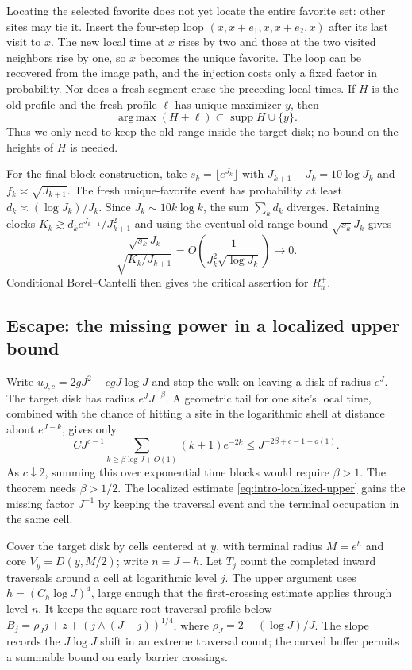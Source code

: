 Locating the selected favorite does not yet locate the entire favorite set:
other sites may tie it. Insert the four-step loop
$(x,x+e_1,x,x+e_2,x)$ after its last visit to $x$. The new local time at
$x$ rises by two and those at the two visited neighbors rise by one, so $x$
becomes the unique favorite. The loop can be recovered from the image path,
and the injection costs only a fixed factor in probability. Nor does a
fresh segment erase the preceding local times. If $H$ is the old profile
and the fresh profile $\ell$ has unique maximizer $y$, then
\[
 \operatorname*{arg\,max}(H+\ell)
 \subset\operatorname{supp}H\cup\{y\}.
\]
Thus we only need to keep the old range inside the target disk; no bound on
the heights of $H$ is needed.

For the final block construction, take $s_k=\lfloor e^{J_k}\rfloor$ with
$J_{k+1}-J_k=10\log J_k$ and $f_k\asymp\sqrt{J_{k+1}}$.
The fresh unique-favorite event has probability at least
$d_k\asymp(\log J_k)/J_k$. Since $J_k\sim10k\log k$, the sum
$\sum_kd_k$ diverges. Retaining clocks
$K_k\gtrsim d_k e^{J_{k+1}}/J_{k+1}^2$ and using the eventual old-range
bound $\sqrt{s_k}J_k$ gives
\[
 \frac{\sqrt{s_k}J_k}{\sqrt{K_k/J_{k+1}}}
 =O\left(\frac1{J_k^2\sqrt{\log J_k}}\right)\longrightarrow0.
\]
Conditional Borel--Cantelli then gives the
critical assertion for $R_n^+$.

\subsection{Escape: the missing power in a localized upper bound}

Write $u_{J,c}=2gJ^2-cgJ\log J$ and stop the walk on leaving a disk of
radius $e^J$. The target disk has radius $e^JJ^{-\beta}$. A geometric
tail for one site's local time, combined with the chance of hitting a site
in the logarithmic shell at distance about $e^{J-k}$, gives only
\begin{equation}\label{eq:ideas-naive-upper}
 C J^{c-1}\sum_{k\ge\beta\log J+O(1)}(k+1)e^{-2k}
 \le J^{-2\beta+c-1+o(1)}.
\end{equation}
As $c\downarrow2$, summing this over exponential time blocks would require
$\beta>1$. The theorem needs $\beta>1/2$. The localized estimate
\eqref{eq:intro-localized-upper} gains the missing factor $J^{-1}$ by
keeping the traversal event and the terminal occupation in the same cell.

Cover the target disk by cells centered at $y$, with terminal radius
$M=e^h$ and core $V_y=D(y,M/2)$; write $n=J-h$. Let $T_j$ count the
completed inward traversals around a cell at logarithmic level $j$.
The upper argument uses $h=(C_h\log J)^4$, large enough that the
first-crossing estimate applies through level $n$. It keeps the
square-root traversal profile below
$B_j=\rho_Jj+z+(j\wedge(J-j))^{1/4}$, where
$\rho_J=2-(\log J)/J$. The slope records the $J\log J$ shift in an
extreme traversal count; the curved buffer permits a summable bound on
early barrier crossings.

